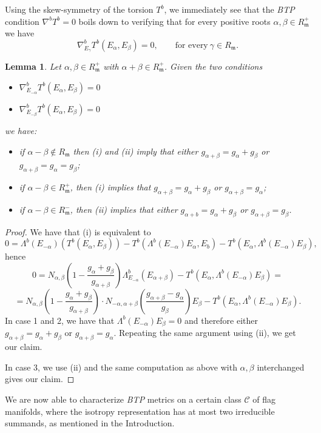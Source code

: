 \documentclass{amsart}
\numberwithin{equation}{section}
\newtheorem{lemma}  [theorem]     {Lemma}
\theoremstyle{definition}
\renewcommand{\1}{\mathds{1}}
\renewcommand{\a}{\alpha}
\renewcommand{\b}{\beta}
\newcommand{\gm}{\mathfrak m}
\renewcommand{\>}{\rightarrow}
\begin{document}
Using the skew-symmetry of the torsion $T^b$, we immediately see that the {\em {\rm BTP}} condition $\nabla^bT^b=0$ boils down to verifying that for every positive roots $\a,\b\in R_\gm^+$ we have
$$\nabla^b_{E_\gamma}T^b(E_\a,E_\b) = 0, \qquad \mbox{for\ every}\ \gamma\in R_\gm.$$
\begin{lemma}\label{Lemma1} Let $\a,\b\in R_\gm^+$ with $\a+\b\in R_\gm^+$. Given the two conditions
\begin{itemize}
\item[i)] $\nabla^b_{E_{-\a}}T^b(E_\a,E_\b)=0$
\item[ii)] $\nabla^b_{E_{-\b}}T^b(E_\a,E_\b)=0$
\end{itemize}
we have:
\begin{itemize}
\item[1.] if $\a-\b\not\in R_\gm$ then (i) and (ii) imply that  either $g_{\a+\b} = g_\a + g_\b$ or $g_{\a+\b} = g_\a=g_\b$;
\item[2.] if  $\a-\b\in R_\gm^+$, then (i) implies that $g_{\a+\b} = g_\a + g_\b$ or $g_{\a+\b} = g_\a$;
\item[3.] if $\a-\b\in R_\gm^-$, then (ii) implies that either $g_{\a+b} = g_\a + g_\b$ or $g_{\a+\b} = g_\b$.
\end{itemize}
\end{lemma}
\begin{proof} We have that (i) is equivalent to
$$0 = \Lambda^b(E_{-\a})(T^b(E_\a,E_\b)) - T^b(\Lambda^b(E_{-\a})E_\a,E_b) - T^b(E_\a,\Lambda^b(E_{-\a})E_\b),$$
hence
$$0= N_{\a,\b}\left( 1 - \frac{g_\a + g_\b}{g_{\a+\b}}\right) \Lambda^b_{E_{-\a}}(E_{\a+\b}) - T^b(E_\a,\Lambda^b(E_{-\a})E_\b) =  $$
$$ = N_{\a,\b}\left( 1 - \frac{g_\a + g_\b}{g_{\a+\b}}\right)\cdot N_{-\a,\a+\b}\left(\frac{g_{\a+\b}-g_\a}{g_{\b}}\right)E_\b - T^b(E_\a,\Lambda^b(E_{-\a})E_\b).$$
In case 1 and 2, we have that $\Lambda^b(E_{-\a})E_\b=0$ and therefore either $g_{\a+\b} = g_\a + g_\b$ or $g_{\a+\b} = g_\a$. Repeating the same argument using (ii), we get our claim.\par
In case 3, we use (ii) and the same computation as above with $\a,\b$ interchanged gives our claim. \end{proof}
\par
We are now able to characterize {\em {\rm BTP}} metrics on a certain class $\mathcal C$ of flag manifolds, where the isotropy representation has at most two irreducible summands, as mentioned in the Introduction.
\end{document}
